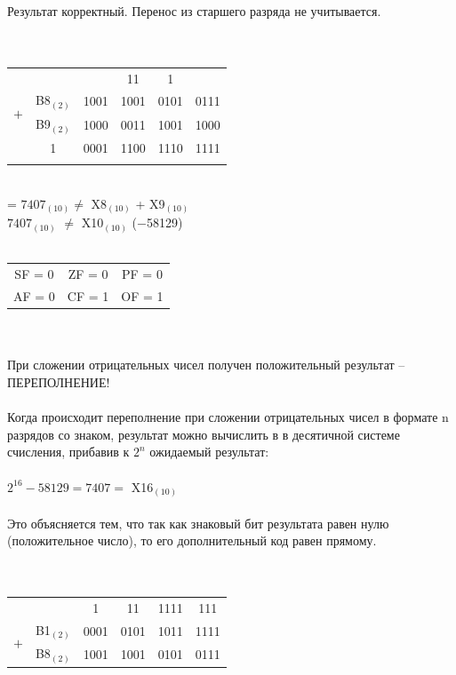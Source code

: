 \documentclass[11pt]{article}
\begin{document}
\begin{paracol}{2}
\begin{enumerate}
		Результат корректный. Перенос из старшего разряда не учитывается.
		\\\\\\
		\begin{tabular}[t]{cccccc}
			&&&\phantom{1}11\phantom{1}&\phantom{11}1\phantom{1}&\\
			\multirow{2}{*}{$+$}  & B8$_{(2)}$ & 1001 & 1001 & 0101 & 0111\\
						            & B9$_{(2)}$ & 1000 & 0011 &  1001 & 1000\\
			\cline{2-6}
						       &   1     & 0001 & 1100 & 1110 & 1111\\
		\\
		\end{tabular}\\
		= $7407_{(10)} \neq$ X8$_{(10)}$ + X9$_{(10)}$\\
		\phantom{=} $7407_{(10)}$ $\neq$ X10$_{(10)}$ ($-$58129)\\\\
		\begin{tabular}{ccc}
			SF = 0 & ZF = 0 & PF = 0 \\
			AF = 0 & CF = 1 & OF = 1\\
		\end{tabular}\\\\
		При сложении отрицательных чисел получен положительный результат -- ПЕРЕПОЛНЕНИЕ!\\\\
		Когда происходит переполнение при сложении отрицательных чисел в формате n разрядов со знаком, результат можно вычислить в в десятичной системе счисления,
		прибавив к $2^n$ ожидаемый результат:\\\\
		\switchcolumn
		$2^{16} - 58129 = 7407 =$ X16$_{(10)}$\\\\
		Это объясняется тем, что так как знаковый бит результата равен нулю (положительное число), то его дополнительный код равен прямому.\\\\\\
		\begin{tabular}[t]{cccccc}
			&       &                                                \phantom{11}1\phantom{1}&\phantom{11}11   &1111 &111\phantom{1}\\
			\multirow{2}{*}{$+$} & B1$_{(2)}$ & 0001 & 0101 & 1011 & 1111\\
						          & B8$_{(2)}$ & 1001 & 1001 & 0101 & 0111\\

\end{tabular}
\end{enumerate}
\end{paracol}
\end{document}
